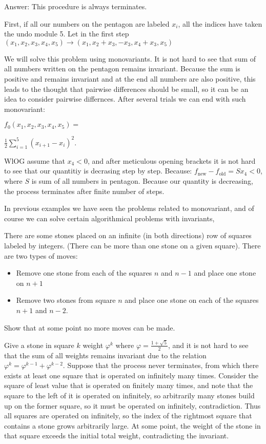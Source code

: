 \sol Answer: This procedure is always terminates.

First, if all our numbers on the pentagon are labeled $x_i$, all the indices have taken the undo module 5. Let in the first step $(x_1,x_2,x_3,x_4,x_5) \to (x_1,x_2+x_3,-x_3,x_4+x_3,x_5)$

We will solve this problem using monovariants. It is not hard to see that sum of all numbers written on the pentagon remains invariant. Because the sum is positive and remains invariant and at the end all numbers are also positive, this leads to the thought that pairwise differences should be small, so it can be an idea to consider pairwise differnces.  After several trials we can end with such monovariant:

$f_0(x_1,x_2,x_3,x_4,x_5)=$

$ \frac{1}{2} \sum_{i=1}^5 (x_{i+1}-x_i)^2$.

WlOG assume that $x_4<0$, and after meticulous opening brackets it is not hard to see that our quantitiy is decrasing step by step. Because: $f_{\text{new}}-f_{\text{old}}=Sx_4<0$, where $S$ is sum of all numbers in pentagon. Because our quantity is decreasing, the process terminates after finite number of steps.

In previous examples we have seen the problems related to monovariant, and of course we can solve certain algorithmical problems with invariants,

\begin{example}
    There are some stones placed on an infinite (in both directions) row of squares labeled by integers. (There can be more than one stone on a given square). There are two types of moves:

    \begin{itemize}
        \item Remove one stone from each of the squares $n$ and $n-1$ and place one stone on $n+1$
        \item Remove two stones from square $n$ and place one stone on each of the squares $n+1$ and $n-2$.
    \end{itemize}

    Show that at some point no more moves can be made.
\end{example}

\sol Give a stone in square $k$ weight $\varphi^k$ where $\varphi=\frac{1+\sqrt{5}}{2}$, and it is not hard to see that the sum of all weights remains invariant due to the relation $\varphi^k = \varphi^{k-1} + \varphi^{k-2}$. Suppose that the process never terminates, from which there exists at least one square that is operated on infinitely many times. Consider the square of least value that is operated on finitely many times, and note that the square to the left of it is operated on infinitely, so arbitrarily many stones build up on the former square, so it must be operated on infinitely, contradiction. Thus all squares are operated on infinitely, so the index of the rightmost square that contains a stone grows arbitrarily large. At some point, the weight of the stone in that square exceeds the initial total weight, contradicting the invariant.

